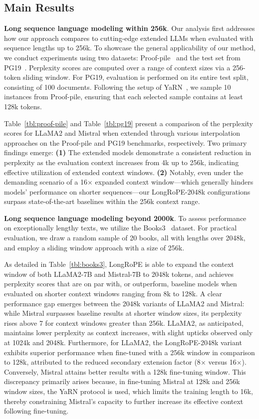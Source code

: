 \subsection{Main Results}

\label{sec:mainresult}
\textbf{Long sequence language modeling within 256k}. Our analysis first addresses how our approach compares to cutting-edge extended LLMs when evaluated with sequence lengths up to 256k. To showcase the general applicability of our method, we conduct experiments using two datasets: Proof-pile~\cite{pg19} and the test set from PG19~\cite{pile}. Perplexity scores are computed over a range of context sizes via a 256-token sliding window. For PG19, evaluation is performed on its entire test split, consisting of 100 documents. Following the setup of YaRN~\cite{yarn}, we sample 10 instances from Proof-pile, ensuring that each selected sample contains at least 128k tokens.

Table~\ref{tbl:proof-pile} and Table~\ref{tbl:pg19} present a comparison of the perplexity scores for LLaMA2 and Mistral when extended through various interpolation approaches on the Proof-pile and PG19 benchmarks, respectively. Two primary findings emerge: \textbf{(1)} The extended models demonstrate a consistent reduction in perplexity as the evaluation context increases from 4k up to 256k, indicating effective utilization of extended context windows. \textbf{(2)} Notably, even under the demanding scenario of a 16$\times$ expanded context window—which generally hinders models’ performance on shorter sequences—our LongRoPE-2048k configurations surpass state-of-the-art baselines within the 256k context range.

\textbf{Long sequence language modeling beyond 2000k}. To assess performance on exceptionally lengthy texts, we utilize the Books3~\cite{pile} dataset. For practical evaluation, we draw a random sample of 20 books, all with lengths over 2048k, and employ a sliding window approach with a size of 256k.

As detailed in Table~\ref{tbl:books3}, LongRoPE is able to expand the context window of both LLaMA2-7B and Mistral-7B to 2048k tokens, and achieves perplexity scores that are on par with, or outperform, baseline models when evaluated on shorter context windows ranging from 8k to 128k. A clear performance gap emerges between the 2048k variants of LLaMA2 and Mistral: while Mistral surpasses baseline results at shorter window sizes, its perplexity rises above 7 for context windows greater than 256k. LLaMA2, as anticipated, maintains lower perplexity as context increases, with slight upticks observed only at 1024k and 2048k. Furthermore, for LLaMA2, the LongRoPE-2048k variant exhibits superior performance when fine-tuned with a 256k window in comparison to 128k, attributed to the reduced secondary extension factor (8$\times$ versus 16$\times$). Conversely, Mistral attains better results with a 128k fine-tuning window. This discrepancy primarily arises because, in fine-tuning Mistral at 128k and 256k window sizes, the YaRN protocol is used, which limits the training length to 16k, thereby constraining Mistral’s capacity to further increase its effective context following fine-tuning.


